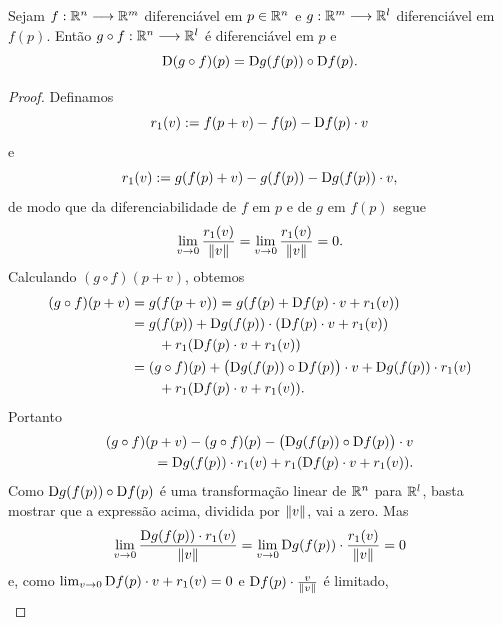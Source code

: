 \begin{prop}
Sejam $f: \mathbb{R}^n \longrightarrow \mathbb{R}^m$ diferenciável em $p \in \mathbb{R}^n$ e $g: \mathbb{R}^m \longrightarrow \mathbb{R}^l$ diferenciável em $f(p)$. Então $g \circ f: \mathbb{R}^n \longrightarrow \mathbb{R}^l$ é diferenciável em $p$ e
	\begin{equation*}
	\mathrm{D} (g \circ f)(p) = \mathrm{D} g(f(p)) \circ \mathrm{D} f(p).
	\end{equation*}
\end{prop}
\begin{proof} Definamos
	\begin{equation*}
	r_1(v) := f(p+v) - f(p) - \mathrm{D} f(p) \cdot v
	\end{equation*}
e
	\begin{equation*}
	r_1(v) := g(f(p)+v) - g(f(p)) - \mathrm{D} g(f(p)) \cdot v,
	\end{equation*}
de modo que da diferenciabilidade de $f$ em $p$ e de $g$ em $f(p)$ segue
	\begin{equation*}
	\lim_{v \rightarrow 0} \frac{r_1(v)}{\left\Vert{v}\right\Vert} = \lim_{v \rightarrow 0} \frac{r_1(v)}{\left\Vert{v}\right\Vert} = 0.
	\end{equation*}	
Calculando $(g \circ f)(p+v)$, obtemos
	\begin{align*}
	(g \circ f)(p+v) &= g(f(p+v)) = g(f(p)+\mathrm{D} f(p) \cdot v + r_1(v)) \\
		&= g(f(p)) + \mathrm{D} g(f(p)) \cdot (\mathrm{D} f(p) \cdot v + r_1(v)) \\
		&\qquad + r_1(\mathrm{D} f(p) \cdot v + r_1(v)) \\
		&= (g \circ f)(p) + \big(\mathrm{D} g(f(p)) \circ \mathrm{D} f(p)\big) \cdot v + \mathrm{D} g(f(p)) \cdot r_1(v) \\
		&\qquad + r_1(\mathrm{D} f(p) \cdot v + r_1(v)).
	\end{align*}
Portanto
	\begin{align*}
	(g \circ f)(p+v) - (g \circ f)(p) - \big(\mathrm{D} g(f(p)) \circ \mathrm{D} f(p)\big) \cdot v \\
	\qquad = \mathrm{D} g(f(p)) \cdot r_1(v) + r_1(\mathrm{D} f(p) \cdot v + r_1(v)).
	\end{align*}
Como $\mathrm{D} g(f(p)) \circ \mathrm{D} f(p)$ é uma transformação linear de $\mathbb{R}^n$ para $\mathbb{R}^l$, basta mostrar que a expressão acima, dividida por $\left\Vert{v}\right\Vert$, vai a zero. Mas
	\begin{equation*}
	\lim_{v \rightarrow 0} \frac{\mathrm{D} g(f(p)) \cdot r_1(v)}{\left\Vert{v}\right\Vert} = \lim_{v \rightarrow 0} \mathrm{D} g(f(p)) \cdot \frac{r_1(v)}{\left\Vert{v}\right\Vert} = 0
	\end{equation*}
e, como $\lim_{v \rightarrow 0} \mathrm{D} f(p) \cdot v + r_1(v) = 0$ e $\mathrm{D} f(p) \cdot \frac{v}{\left\Vert{v}\right\Vert}$ é limitado,
	\begin{align*}

\end{align*}
\end{proof}
